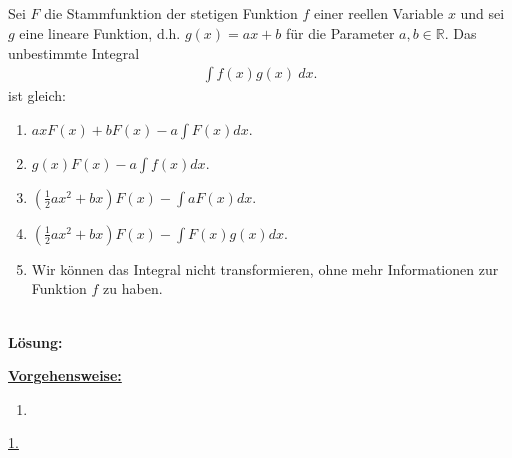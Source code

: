 \subsection*{}
Sei $ F $ die Stammfunktion der stetigen Funktion $ f $ einer reellen Variable $ x $ und sei $ g $ eine lineare Funktion, d.h. $ g(x) = ax +b $ für die Parameter $ a,b \in \mathbb{R} $. Das unbestimmte Integral
\begin{align*}
	\int f(x) g(x) \ dx.
\end{align*}
ist gleich:
\renewcommand{\labelenumi}{(\alph{enumi})}
\begin{enumerate}
	\item 
	$ a x F(x) + b F(x) - a \int F(x) dx$.
	\item 
	$ g(x) F(x) - a \int f(x) dx$.
	\item 
	$ \left(\frac{1}{2} a x^2 +b x\right) F(x) - \int a F(x) dx$.
	\item
	$ \left(\frac{1}{2} a x^2 +b x\right) F(x) - \int  F(x) g(x) dx$.
	\item 
	Wir können das Integral nicht transformieren, ohne mehr Informationen zur Funktion $ f $ zu haben.
\end{enumerate}
\ \\
\textbf{Lösung:}
\begin{mdframed}
\underline{\textbf{Vorgehensweise:}}
\renewcommand{\labelenumi}{\theenumi.}
\begin{enumerate}
\item 
\end{enumerate}
\end{mdframed}

\underline{1. }\\


\newpage

